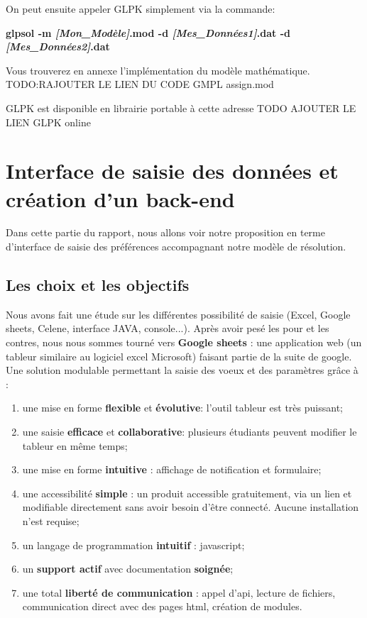 \documentclass[final,poster]{polytech/polytech}
\begin{document}
On peut ensuite appeler GLPK simplement via la commande:
\begin{center}
\textbf{glpsol -m \textit{[Mon\_Modèle]}.mod -d \textit{[Mes\_Données1]}.dat -d \textit{[Mes\_Données2]}.dat}
\end{center}

Vous trouverez en annexe  l'implémentation du modèle mathématique. TODO:RAJOUTER LE LIEN DU CODE GMPL assign.mod

GLPK est disponible en librairie portable à cette adresse TODO AJOUTER LE LIEN GLPK online

\section{Interface de saisie des données et création d'un back-end}
Dans cette partie du rapport, nous allons voir notre proposition en terme d'interface de saisie des préférences accompagnant notre modèle de résolution.

\subsection{Les choix et les objectifs}
Nous avons fait une étude sur les différentes possibilité de saisie (Excel, Google sheets, Celene, interface JAVA, console...).
Après avoir pesé les pour et les contres, nous nous sommes tourné vers \textbf{Google sheets} : une application web (un tableur similaire au logiciel excel Microsoft) faisant partie de la suite de google.
Une solution modulable permettant la saisie des voeux et des paramètres grâce à :
\begin{enumerate}
\item une mise en forme \textbf{flexible} et \textbf{évolutive}: l'outil tableur est très puissant;
\item une saisie \textbf{efficace} et \textbf{collaborative}: plusieurs étudiants peuvent modifier le tableur en même temps;
\item une mise en forme \textbf{intuitive} : affichage de notification et formulaire;
\item une accessibilité \textbf{simple} : un produit accessible gratuitement, via un lien et modifiable directement sans avoir besoin d'être connecté. Aucune installation n’est requise;
\item un langage de programmation \textbf{intuitif} : javascript;
\item un \textbf{support actif} avec documentation \textbf{soignée};
\item une total \textbf{liberté de communication} : appel d’api, lecture de fichiers, communication direct avec des pages html, création de modules.
\end{enumerate}
\end{document}
